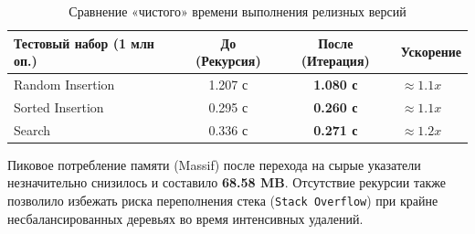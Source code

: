 \begin{table}[h!]
\centering
\begin{tabular}{|l|c|c|l|}
\hline
\textbf{Тестовый набор (1 млн оп.)} & \textbf{До (Рекурсия)} & \textbf{После (Итерация)} & \textbf{Ускорение} \\ \hline
Random Insertion & 1.207 с & \textbf{1.080 с} & $\approx 1.1x$ \\ \hline
Sorted Insertion & 0.295 с & \textbf{0.260 с} & $\approx 1.1x$ \\ \hline
Search           & 0.336 с & \textbf{0.271 с} & $\approx 1.2x$ \\ \hline
\end{tabular}
\caption{Сравнение «чистого» времени выполнения релизных версий}
\label{tab:bench_results}
\end{table}

Пиковое потребление памяти (Massif) после перехода на сырые указатели незначительно снизилось и составило \textbf{68.58 MB}. Отсутствие рекурсии также позволило избежать риска переполнения стека (\texttt{Stack Overflow}) при крайне несбалансированных деревьях во время интенсивных удалений.
\pagebreak